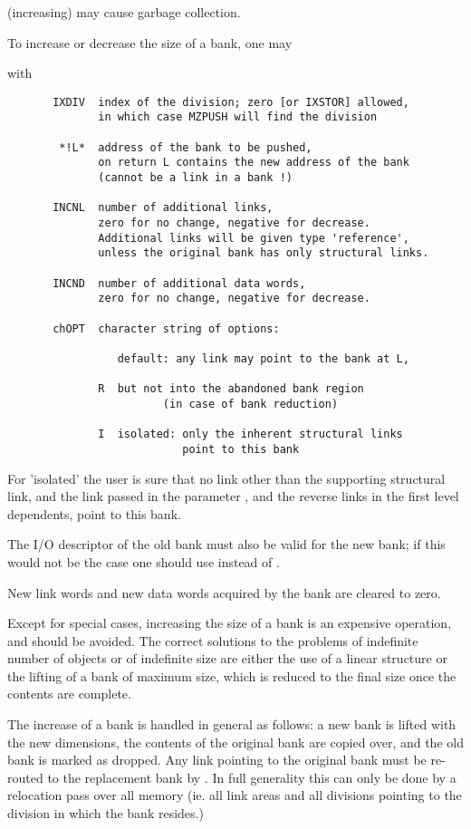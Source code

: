  (increasing) may cause garbage collection.

To increase or decrease the size of a bank, one may


with
\begin{verbatim}
       IXDIV  index of the division; zero [or IXSTOR] allowed,
              in which case MZPUSH will find the division

        *!L*  address of the bank to be pushed,
              on return L contains the new address of the bank
              (cannot be a link in a bank !)

       INCNL  number of additional links,
              zero for no change, negative for decrease.
              Additional links will be given type 'reference',
              unless the original bank has only structural links.

       INCND  number of additional data words,
              zero for no change, negative for decrease.

       chOPT  character string of options:

                 default: any link may point to the bank at L,

              R  but not into the abandoned bank region
                        (in case of bank reduction)

              I  isolated: only the inherent structural links
                           point to this bank
\end{verbatim} 
For 'isolated' the user is sure that no link other than the
supporting structural link, and the link passed in the parameter ,
and the reverse links in the first level dependents,
point to this bank.

The I/O descriptor of the old bank must also be valid for the
new bank; if this would not be the case one should use 
 instead of .

New link words and new data words acquired by the bank
are cleared to zero.

Except for special cases,
increasing the size of a bank is an expensive operation,
and should be avoided.
The correct solutions to the problems of indefinite number of objects
or of indefinite size are either the use of a linear structure
or the lifting of a bank of maximum size,
which is reduced to the final size once the contents are complete.

The increase of a bank is handled in general as follows:
a new bank is lifted with the new dimensions,
the contents of the original bank are copied over,
and the old bank is marked as dropped.
Any link pointing to the original bank must be re-routed
to the replacement bank by .
In full generality this can only be done by a relocation pass
over all memory (ie. all link areas and all divisions pointing
to the division in which the bank resides.)

